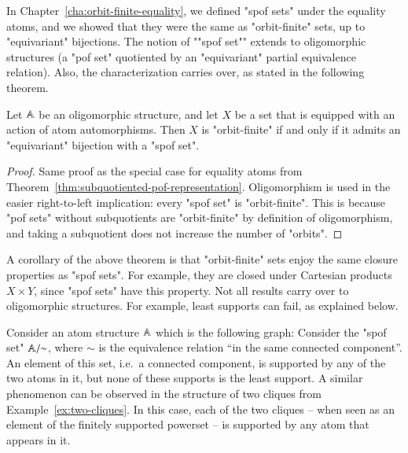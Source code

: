 In Chapter~\ref{cha:orbit-finite-equality}, we defined "spof sets" under the equality atoms, and we showed that they were the same as "orbit-finite" sets, up to "equivariant" bijections. The notion of  ""spof set"" extends to oligomorphic structures (a "pof set" quotiented by an "equivariant" partial equivalence relation). Also,  the characterization carries over, as stated in the following theorem.

\begin{theorem}\label{thm:spof=orbit-finite}
	Let $\mathbb A$ be an oligomorphic structure, and let $X$ be a set that is equipped with an action of atom automorphisms. Then $X$ is "orbit-finite" if and only if it admits an "equivariant" bijection with a  "spof set". 
\end{theorem}
\begin{proof}
	Same  proof as the special case for equality atoms from Theorem~\ref{thm:subquotiented-pof-representation}. Oligomorphism is used in the easier right-to-left implication: every  "spof set" is "orbit-finite". This is because  "pof sets" without subquotients are "orbit-finite" by definition of oligomorphism, and taking a subquotient does not increase the number of "orbits". 
\end{proof}

A corollary of the above theorem is that "orbit-finite" sets enjoy the same closure properties as  "spof sets". For example, they are closed under Cartesian products $X \times Y$, since "spof sets" have this property. 
Not all results carry over to oligomorphic structures. For example, least supports can fail, as explained below. 

\begin{myexample}
	Consider an atom structure $\mathbb A$ which is the following graph:
	Consider the  "spof set" $\mathbb A/\!\!\sim$, where $\sim$ is the equivalence relation ``in the same connected component''. An element of this set, i.e.~a connected component, is supported by any of the two atoms in it, but none of these supports is the least support.
	A similar phenomenon can be observed in the structure of two cliques from Example~\ref{ex:two-cliques}. In this case, each of the two cliques -- when seen as an element of the finitely supported powerset -- is supported by any atom that appears in it. 
\end{myexample}


\exercisepart
